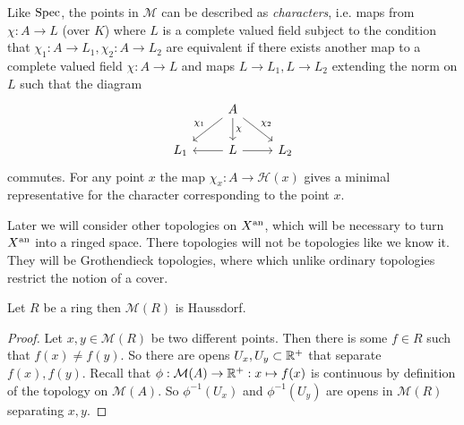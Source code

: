 Like $\operatorname{Spec}$, the points in $\mathcal{M} $ can be described as \emph{characters}, i.e.  maps from $\chi: A \to L$ (over $K$) where $L$ is a complete valued field subject to the condition that $\chi_1: A \to L_1, \chi_2: A \to L_2$ are equivalent if there exists another map to a complete valued field $\chi: A \to L$  and maps $L \to L_1, L \to L_2$ extending the norm on $L$ such that the diagram 
\[
\begin{tikzcd}
	& A \ar{dl}[']{\chi_1} \ar{dr}{\chi_2} \dar{\chi} \\
	L_1 & L \lar \rar & L_2
\end{tikzcd}
\] 
commutes. 
For any point $x$ the map $\chi_x: A \to \mathcal{H} (x)$ gives a minimal representative for the character corresponding to the point $x$. 


\begin{remark}
	Later we will consider other topologies on $X{}^{\text{an}}$, which will be necessary to turn $X{}^{\text{an}} $ into a ringed space. 
	There topologies will not be topologies like we know it. They will be Grothendieck topologies, where which unlike ordinary topologies restrict the notion of a cover. 
\end{remark}

\begin{proposition}
	Let $R$ be a ring then $\mathcal{M} (R)$ is Haussdorf. 
\end{proposition}
\begin{proof}
	Let $x, y \in \mathcal{M} (R)$ be two different points. 
	Then there is some $f \in R$ such that $f(x) \ne f(y)$. 
	So there are opens $U_x, U_y \subset  \mathbb{R}^{ +}$ that separate $f(x), f(y)$.
	Recall that $\phi: \mathcal{M} (A) \to \mathbb{R}^{ + }: x \mapsto f(x)$ is continuous by definition of the topology on $\mathcal{M} (A)$. 
	So $\phi^{-1}(U_x)$ and $\phi^{-1}(U_y)$ are opens in $\mathcal{M} (R)$ separating $x,y$. 
\end{proof}


